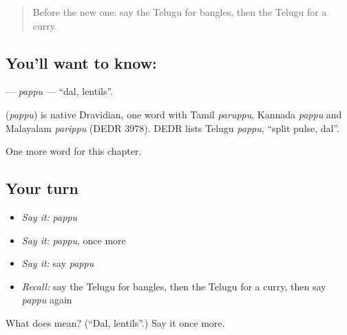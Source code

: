 \label{lesson:TE-C115-pappu}



\begin{quote}
Before the new one: say the Telugu for bangles, then the Telugu for a curry.
\end{quote}

\subsection*{You'll want to know: }
\textbf{} — \emph{pappu} — \textquotedblleft{}dal, lentils\textquotedblright{}.

\begin{cousinweb}
\textbf{} (\emph{pappu}) is native Dravidian, one word with Tamil \emph{paruppu}, Kannada \emph{pappu} and Malayalam \emph{parippu} (DEDR 3978). DEDR lists Telugu \emph{pappu}, \textquotedblleft{}split pulse, dal\textquotedblright{}.
\end{cousinweb}

\begin{grammarlens}[title={What you've built}]
One more word for this chapter.
\end{grammarlens}

\subsection*{Your turn}
\begin{itemize}
\raggedright
  \item \emph{Say it:} \emph{pappu}
  \item \emph{Say it:} \emph{pappu}, once more
  \item \emph{Say it:} say \emph{pappu}
  \item \emph{Recall:} say the Telugu for bangles, then the Telugu for a curry, then say \emph{pappu} again
\end{itemize}

\begin{tcolorbox}[breakable,colback=teal!4,colframe=teal!35!black,title={Before you move on}]
What does  mean? (\textquotedblleft{}Dal, lentils\textquotedblright{}.) Say it once more.
\end{tcolorbox}
